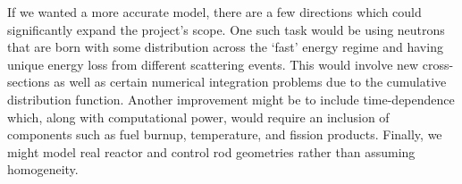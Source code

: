 \documentclass{notes}
\begin{document}
If we wanted a more accurate model, there are a few directions which could significantly expand the project's scope. One such task would be using neutrons that are born with some distribution across the `fast' energy regime and having unique energy loss from different scattering events. This would involve new cross-sections as well as certain numerical integration problems due to the cumulative distribution function. Another improvement might be to include time-dependence which, along with computational power, would require an inclusion of components such as fuel burnup, temperature, and fission products. Finally, we might model real reactor and control rod geometries rather than assuming homogeneity.

\nocite{*}

\end{document}
